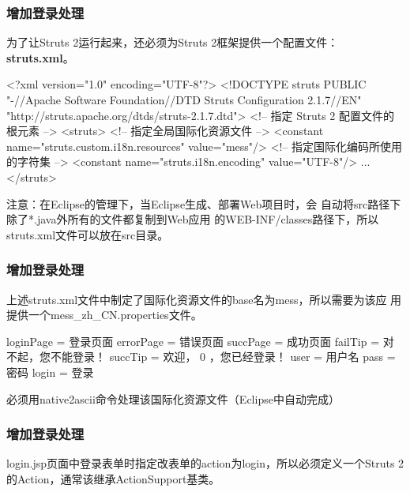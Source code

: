 \begin{frame}[fragile] %
  \frametitle{增加登录处理}

  为了让Struts 2运行起来，还必须为Struts 2框架提供一个配置文件：{\bf\Red struts.xml}。


  \begin{xmlCode}
    <?xml version="1.0" encoding="UTF-8"?>
    <!DOCTYPE struts PUBLIC
    "-//Apache Software Foundation//DTD Struts Configuration 2.1.7//EN"
    "http://struts.apache.org/dtds/struts-2.1.7.dtd">
    <!-- 指定 Struts 2 配置文件的根元素 -->
    <struts>
      <!-- 指定全局国际化资源文件 -->
      <constant name="struts.custom.i18n.resources" value="mess"/>
      <!-- 指定国际化编码所使用的字符集 -->	
      <constant name="struts.i18n.encoding" value="UTF-8"/>
      ...
    </struts>  
  \end{xmlCode}

  {\kai\Blue 注意：在Eclipse的管理下，当Eclipse生成、部署Web项目时，会
    自动将src路径下除了*.java外所有的文件都复制到Web应用
    的WEB-INF/classes路径下，所以struts.xml文件可以放在src目录。}

\end{frame}
\begin{frame}[fragile] %
\frametitle{增加登录处理}

上述struts.xml文件中制定了国际化资源文件的base名为mess，所以需要为该应
用提供一个mess\_zh\_CN.properties文件。


\begin{xmlCode}
loginPage = 登录页面
errorPage = 错误页面
succPage = 成功页面
failTip = 对不起，您不能登录！
succTip = 欢迎， {0} ，您已经登录！
user = 用户名
pass = 密码
login = 登录
\end{xmlCode}

必须用native2ascii命令处理该国际化资源文件（Eclipse中自动完成）

\end{frame}

\begin{frame}[fragile] %
\frametitle{增加登录处理}

login.jsp页面中登录表单时指定改表单的action为login，所以必须定义一个Struts
2的Action，通常该继承ActionSupport基类。
\end{frame}

